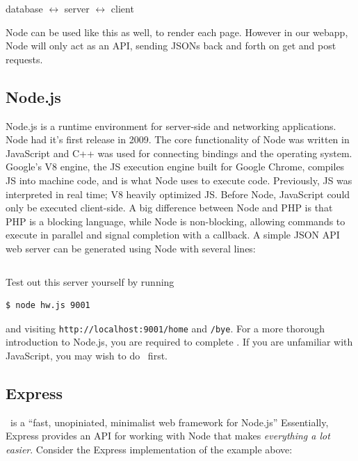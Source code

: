 \begin{center}
database $\leftrightarrow$ server $\leftrightarrow$ client
\end{center}

Node can be used like this as well, to render each page. However in our webapp,
Node will only act as an API, sending JSONs back and forth on get and post 
requests. 

\subsection{Node.js}

Node.js is a runtime environment for server-side and networking applications.
Node had it's first release in 2009. The core functionality of Node was written
in JavaScript and C++ was used for connecting bindings and the operating system.
Google's V8 engine, the JS execution engine built for Google Chrome, compiles JS
into machine code, and is what Node uses to execute code. Previously, JS was
interpreted in real time; V8 heavily optimized JS.  Before Node, JavaScript
could only be executed client-side. A big difference between Node and PHP is
that PHP is a blocking language, while Node is non-blocking, allowing commands
to execute in parallel and signal completion with a callback.  A simple JSON API
web server can be generated using Node with several lines:

\inputminted{js}{files/nodejs/hw.js}

Test out this server yourself by running

\begin{verbatim}
$ node hw.js 9001
\end{verbatim}

and visiting \texttt{http://localhost:9001/home} and  \texttt{/bye}. For a more
thorough introduction to Node.js, you are required to complete \learnyounode.
If you are unfamiliar with JavaScript, you may wish to do \javascripting\ first.

\subsection{Express}

\ExpressJS\ is a ``fast, unopiniated, minimalist web framework for Node.js''
Essentially, Express provides an API for working with Node that makes
\textit{everything a lot easier}. Consider the Express implementation of the 
example above:

\inputminted{js}{files/express/hw.js}

